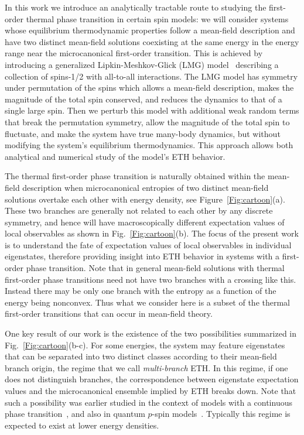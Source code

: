 \documentclass[aps,prx,showpacs,amsmath,amssymb,superscriptaddress,twocolumn,longbibliography,10pt,nofootinbib]{revtex4-2}
\begin{document}
In this work we introduce an analytically tractable route to studying the first-order thermal phase transition in certain spin models: we will consider systems whose equilibrium thermodynamic properties follow a mean-field description and have two distinct mean-field solutions coexisting at the same energy in the energy range near the microcanonical first-order transition.  This is achieved by introducing a generalized Lipkin-Meshkov-Glick (LMG) model~\cite{LMG65} describing a collection of  spins-1/2 with all-to-all interactions.  The LMG model has symmetry under permutation of the spins which allows a mean-field description,  makes the magnitude of the total spin conserved, and reduces the dynamics to that of a single large spin. Then we perturb this model with additional weak random terms that break the permutation symmetry, allow the magnitude of the total spin to fluctuate, and make the system have true many-body dynamics, but without modifying the system's equilibrium thermodynamics.  This approach allows both analytical and numerical study of the model's ETH behavior. 

The thermal first-order phase transition is naturally obtained within the mean-field description when microcanonical entropies of two distinct mean-field solutions overtake each other with energy density, see Figure~\ref{Fig:cartoon}(a). These two branches are generally not related to each other by any discrete symmetry, and hence will have macroscopically different expectation values of local observables as shown in Fig.~\ref{Fig:cartoon}(b). The focus of the present work is to understand the fate of expectation values of local observables in individual eigenstates, therefore providing insight into ETH behavior in systems with a first-order phase transition.  Note that in general mean-field solutions with thermal first-order phase transitions need not have two branches with a crossing like this.  Instead there may be only one branch with the entropy as a function of the energy being nonconvex.  Thus what we consider here is a subset of the thermal first-order transitions that can occur in mean-field theory.

One key result of our work is the existence of the two possibilities summarized in Fig.~\ref{Fig:cartoon}(b-c). For some energies, the system may feature eigenstates that can be separated into two distinct classes according to their mean-field branch origin, the regime that we call \emph{multi-branch} ETH. In this regime, if one does not distinguish branches, the correspondence between eigenstate expectation values and the microcanonical ensemble implied by ETH breaks down. Note that such a possibility was earlier studied in the context of models with a continuous phase transition~\cite{Huse14,Srednicki15,Srednicki16,SrednickiRigol2016}, and also in quantum $p$-spin models~\cite{Scardicchio17}. Typically this regime is expected to exist at lower energy densities. 
\end{document}
